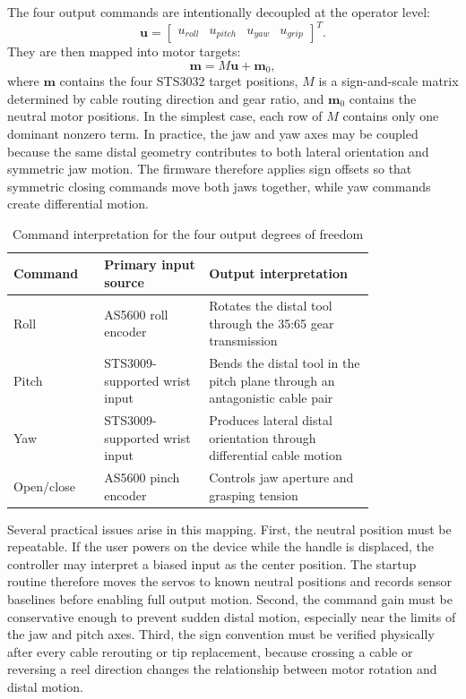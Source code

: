 The four output commands are intentionally decoupled at the operator level:
\[
\mathbf{u}=
\begin{bmatrix}
u_{roll} & u_{pitch} & u_{yaw} & u_{grip}
\end{bmatrix}^T .
\]
They are then mapped into motor targets:
\[
\mathbf{m}=M\mathbf{u}+\mathbf{m}_0 ,
\]
where $\mathbf{m}$ contains the four STS3032 target positions, $M$ is a sign-and-scale matrix determined by cable routing direction and gear ratio, and $\mathbf{m}_0$ contains the neutral motor positions. In the simplest case, each row of $M$ contains only one dominant nonzero term. In practice, the jaw and yaw axes may be coupled because the same distal geometry contributes to both lateral orientation and symmetric jaw motion. The firmware therefore applies sign offsets so that symmetric closing commands move both jaws together, while yaw commands create differential motion.

\begin{table}[htbp]
    \centering
    \caption{Command interpretation for the four output degrees of freedom}
    \label{tab:command_mapping}
    \begin{tabular}{p{0.18\linewidth} p{0.24\linewidth} p{0.38\linewidth}}
        \toprule
        Command & Primary input source & Output interpretation \\
        \midrule
        Roll & AS5600 roll encoder & Rotates the distal tool through the 35:65 gear transmission \\
        Pitch & STS3009-supported wrist input & Bends the distal tool in the pitch plane through an antagonistic cable pair \\
        Yaw & STS3009-supported wrist input & Produces lateral distal orientation through differential cable motion \\
        Open/close & AS5600 pinch encoder & Controls jaw aperture and grasping tension \\
        \bottomrule
    \end{tabular}
\end{table}

Several practical issues arise in this mapping. First, the neutral position must be repeatable. If the user powers on the device while the handle is displaced, the controller may interpret a biased input as the center position. The startup routine therefore moves the servos to known neutral positions and records sensor baselines before enabling full output motion. Second, the command gain must be conservative enough to prevent sudden distal motion, especially near the limits of the jaw and pitch axes. Third, the sign convention must be verified physically after every cable rerouting or tip replacement, because crossing a cable or reversing a reel direction changes the relationship between motor rotation and distal motion.

